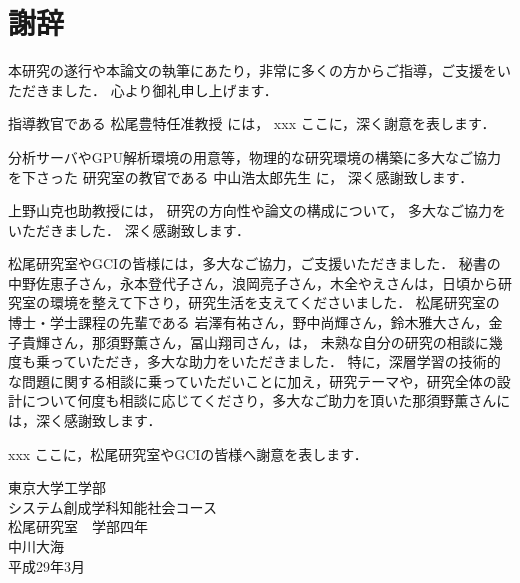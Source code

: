 \chapter*{謝辞}
\fancyhf{}
\rhead{}
\lhead{}
\cfoot{\thepage}

本研究の遂行や本論文の執筆にあたり，非常に多くの方からご指導，ご支援をいただきました．
心より御礼申し上げます．
\vvspace

指導教官である 松尾豊特任准教授 には，
xxx
ここに，深く謝意を表します．
\vvspace

分析サーバやGPU解析環境の用意等，物理的な研究環境の構築に多大なご協力を下さった
研究室の教官である 中山浩太郎先生 に，
深く感謝致します．
\vvspace

上野山克也助教授には，
研究の方向性や論文の構成について，
多大なご協力をいただきました．
深く感謝致します．
\vvspace

松尾研究室やGCIの皆様には，多大なご協力，ご支援いただきました．
秘書の 中野佐恵子さん，永本登代子さん，浪岡亮子さん，木全やえさんは，日頃から研究室の環境を整えて下さり，研究生活を支えてくださいました．
松尾研究室の博士・学士課程の先輩である 岩澤有祐さん，野中尚輝さん，鈴木雅大さん，金子貴輝さん，那須野薫さん，冨山翔司さん，は，
未熟な自分の研究の相談に幾度も乗っていただき，多大な助力をいただきました．
特に，深層学習の技術的な問題に関する相談に乗っていただいことに加え，研究テーマや，研究全体の設計について何度も相談に応じてくださり，多大なご助力を頂いた那須野薫さんには，深く感謝致します．

xxx
ここに，松尾研究室やGCIの皆様へ謝意を表します．
\vvspace





\vvspace
\vvspace
\begin{flushright}
東京大学工学部\\
システム創成学科知能社会コース\\
松尾研究室　学部四年\\
中川大海\\
平成29年3月\\
\end{flushright}
